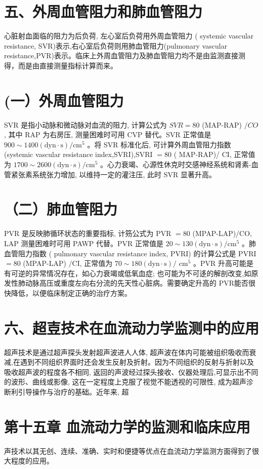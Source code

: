 \documentclass[10pt]{article}
\begin{document}
\section*{五、外周血管阻力和肺血管阻力}
心脏射血面临的阻力为后负荷, 左心室后负荷用外周血管阻力 ( systemic vascular resistance, SVR)表示,右心室后负荷则用肺血管阻力(pulmonary vascular resistance,PVR)表示。临床上外周血管阻力及肺血管阻力均不是由监测直接测得，而是由直接测量指标计算而来。

\section*{(一）外周血管阻力}
SVR 是指小动脉和微动脉对血流的阻力, 计算公式为 $S V R=80$ (MAP-RAP) $/ C O$, 其中 RAP 为右房压, 测量困难时可用 CVP 替代。SVR 正常值是 $900 \sim 1400(\mathrm{dyn} \cdot \mathrm{s}) / \mathrm{cm}^{5}$ 。将 SVR 标准化后, 可计算外周血管阻力指数 (systemic vascular resistance index,SVRI),SVRI $=80$ ( MAP-RAP)/ $\mathrm{CI}$, 正常值为 $1700 \sim 2600(\mathrm{dyn} \cdot \mathrm{s}) / \mathrm{cm}^{5}$ 。心力衰竭、心源性休克时交感神经系统和肾素-血管紧张素系统张力增加, 以维持一定的灌注压, 此时 SVR 显著升高。

\section*{（二）肺血管阻力}
PVR 是反映肺循环状态的重要指标, 计䇟公式为 PVR $=80$ (MPAP-LAP)/CO, LAP 测量困难时可用 PAWP 代替。PVR 正常值是 $20 \sim 130(\mathrm{dyn} \cdot \mathrm{s}) / \mathrm{cm}^{5}$ 。肺血管阻力指数 ( pulmonary vascular resistance index, PVRI) 的计算公式是 PVRI $=80$ (MPAP-LAP) $/ \mathrm{CI}$, 正常值为 $70 \sim 180(\mathrm{dyn} \cdot \mathrm{s}) /$ $\mathrm{cm}^{5}$ 。PVR 升高可能是有可逆的异常情况存在，如心力衰竭或低氧血症; 也可能为不可迻的解剖改变,如原发性肺动脉高压或重度左向右分流的先天性心脏病。需要确定升高的 PVR能否很快降低，以便临床制定正确的治疗方案。

\section*{六、超壴技术在血流动力学监测中的应用}
超声技术是通过超声探头发射超声波进人人体, 超声波在体内可能被组织吸收而衰减,在遇到不同组织界面时还会发生反射及折射。因为不同组织的反射与折射以及吸收超声波的程度各不相同, 返回的声波经过探头接收、仪器处理后,可显示出不同的波形、曲线或影像, 这在一定程度上克服了视觉不能透视的可限性, 成为超声沴断利引导操作与治疗的基础。近年来, 超

\section*{第十五章 血流动力学的监测和临床应用}
声技术以其无创、连续、准确、实时和便捷等优点在血流动力学监测方面得到了很大程度的应用。
\end{document}
